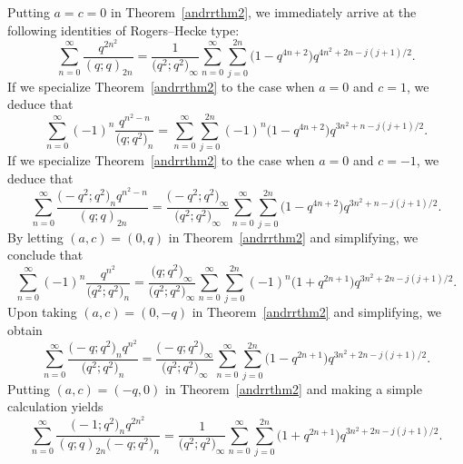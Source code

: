\documentclass[10pt,a4paper]{amsart}
\numberwithin{equation}{section}
\begin{document}
Putting $a=c=0$ in Theorem~\ref{andrrthm2}, we immediately arrive at the following identities of Rogers--Hecke type:
\begin{equation*}%
\sum_{n=0}^\infty \frac{q^{2n^2}}{(q; q)_{2n}}
=\frac{1}{\bigl(q^2; q^2\bigr)_\infty}	
\sum_{n=0}^\infty \sum_{j=0}^{2n} \bigl(1-q^{4n+2}\bigr) q^{4n^2+2n-j(j+1)/2}.
\end{equation*}
If we specialize Theorem~\ref{andrrthm2} to the case when $a=0$ and $c=1$, we deduce that
\begin{equation*}%
\sum_{n=0}^\infty(-1)^n\frac{q^{n^2-n}}{\bigl(q; q^2\bigr)_n}
=\sum_{n=0}^\infty \sum_{j=0}^{2n} (-1)^n \bigl(1-q^{4n+2}\bigr) q^{3n^2+n-j(j+1)/2}.
\end{equation*}
If we specialize Theorem~\ref{andrrthm2} to the case when $a=0$ and $c=-1$, we deduce that
\begin{equation*}%
	\sum_{n=0}^\infty \frac{\bigl(-q^2; q^2\bigr)_n q^{n^2-n}}{(q; q)_{2n}}
	=\frac{\bigl(-q^2; q^2\bigr)_\infty}{\bigl(q^2; q^2\bigr)_\infty}\sum_{n=0}^\infty \sum_{j=0}^{2n} \bigl(1-q^{4n+2}\bigr) q^{3n^2+n-j(j+1)/2}.
\end{equation*}
By letting $(a, c)=(0, q)$ in Theorem~\ref{andrrthm2} and simplifying, we conclude that
\begin{equation*}%
	\sum_{n=0}^\infty (-1)^n \frac{q^{n^2}}{\bigl(q^2; q^2\bigr)_n}
	=\frac{\bigl(q; q^2\bigr)_\infty}{\bigl(q^2; q^2\bigr)_\infty}\sum_{n=0}^\infty \sum_{j=0}^{2n} (-1)^n \bigl(1+q^{2n+1}\bigr) q^{3n^2+2n-j(j+1)/2}.
\end{equation*}
Upon taking $(a, c)=(0, -q)$ in Theorem~\ref{andrrthm2} and simplifying, we obtain
\begin{equation*}%
	\sum_{n=0}^\infty \frac{\bigl(-q; q^2\bigr)_n q^{n^2}}{\bigl(q^2; q^2\bigr)_n}
	=\frac{\bigl(-q; q^2\bigr)_\infty}{\bigl(q^2; q^2\bigr)_\infty}\sum_{n=0}^\infty \sum_{j=0}^{2n} \bigl(1-q^{2n+1}\bigr) q^{3n^2+2n-j(j+1)/2}.
\end{equation*}
Putting $(a, c)=(-q, 0)$ in Theorem~\ref{andrrthm2} and making a simple calculation yields
\begin{equation*}%
\sum_{n=0}^\infty \frac{\bigl(-1; q^2\bigr)_n q^{2n^2}}{(q; q)_{2n} \bigl(-q; q^2\bigr)_n}
=\frac{1}{\bigl(q^2; q^2\bigr)_\infty}
\sum_{n=0}^\infty \sum_{j=0}^{2n} \bigl(1+q^{2n+1}\bigr) q^{3n^2+2n-j(j+1)/2}.
\end{equation*}
\end{document}
